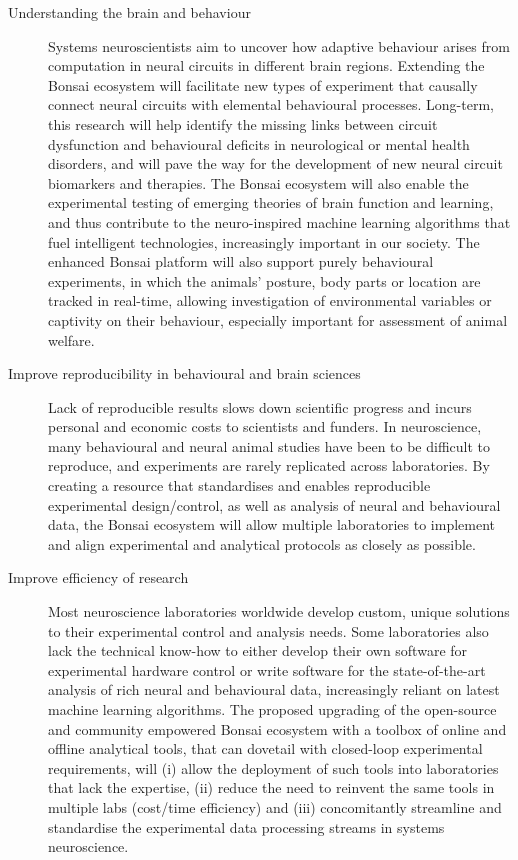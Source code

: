 \documentclass[a4paper,11pt]{article}
\begin{document}
\begin{description}

    \item[Understanding the brain and behaviour] Systems neuroscientists aim to
        uncover how adaptive behaviour arises from computation in neural
        circuits in different brain regions. Extending the Bonsai ecosystem
        will facilitate new types of experiment that causally connect neural
        circuits with elemental behavioural processes. Long-term, this research
        will help identify the missing links between circuit dysfunction and
        behavioural deficits in neurological or mental health disorders, and
        will pave the way for the development of new neural circuit biomarkers
        and therapies. The Bonsai ecosystem will also enable the experimental
        testing of emerging theories of brain function and learning, and thus
        contribute to the neuro-inspired machine learning algorithms that fuel
        intelligent technologies, increasingly important in our society.  The
        enhanced Bonsai platform will also support purely behavioural
        experiments, in which the animals' posture, body parts or location are
        tracked in real-time, allowing investigation of environmental variables
        or captivity on their behaviour, especially important for assessment of
        animal welfare.   

    \item[Improve reproducibility in behavioural and brain sciences] Lack of
        reproducible results slows down scientific progress and incurs personal
        and economic costs to scientists and funders.  In neuroscience,  many
        behavioural and neural animal studies have been to be difficult to
        reproduce, and experiments are rarely replicated across laboratories.
        By creating a resource that standardises and enables reproducible
        experimental design/control, as well as analysis of neural and
        behavioural data, the Bonsai ecosystem will allow multiple laboratories
        to implement and align experimental and analytical protocols as closely
        as possible.

    \item[Improve efficiency of research] Most neuroscience laboratories
        worldwide develop custom, unique solutions to their experimental
        control and analysis needs. Some laboratories also lack the technical
        know-how to either develop their own software for experimental hardware
        control or write software for the state-of-the-art analysis of rich
        neural and behavioural data, increasingly reliant on latest machine
        learning algorithms. The proposed upgrading of the open-source and
        community empowered Bonsai ecosystem with a toolbox of online and
        offline analytical tools, that can dovetail with closed-loop
        experimental requirements, will (i) allow the deployment of such tools
        into laboratories that lack the expertise, (ii) reduce the need to
        reinvent the same tools in multiple labs (cost/time efficiency) and
        (iii) concomitantly streamline and standardise the experimental data
        processing streams in systems neuroscience.


\end{description}
\end{document}
